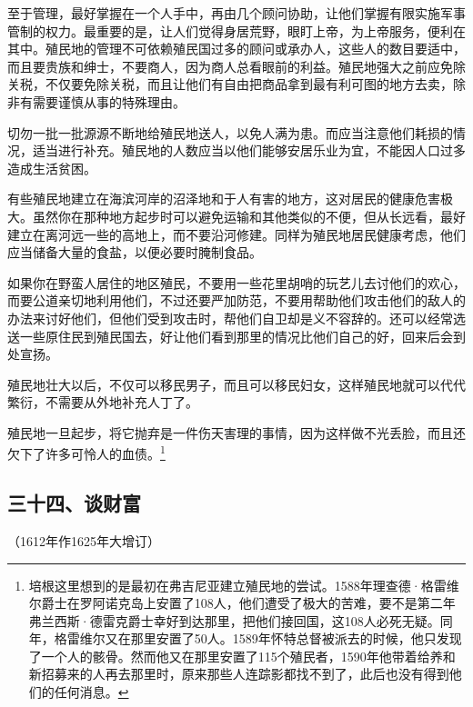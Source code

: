 \par 至于管理，最好掌握在一个人手中，再由几个顾问协助，让他们掌握有限实施军事管制的权力。最重要的是，让人们觉得身居荒野，眼盯上帝，为上帝服务，便利在其中。殖民地的管理不可依赖殖民国过多的顾问或承办人，这些人的数目要适中，而且要贵族和绅士，不要商人，因为商人总看眼前的利益。殖民地强大之前应免除关税，不仅要免除关税，而且让他们有自由把商品拿到最有利可图的地方去卖，除非有需要谨慎从事的特殊理由。
\par 切勿一批一批源源不断地给殖民地送人，以免人满为患。而应当注意他们耗损的情况，适当进行补充。殖民地的人数应当以他们能够安居乐业为宜，不能因人口过多造成生活贫困。
\par 有些殖民地建立在海滨河岸的沼泽地和于人有害的地方，这对居民的健康危害极大。虽然你在那种地方起步时可以避免运输和其他类似的不便，但从长远看，最好建立在离河远一些的高地上，而不要沿河修建。同样为殖民地居民健康考虑，他们应当储备大量的食盐，以便必要时腌制食品。
\par 如果你在野蛮人居住的地区殖民，不要用一些花里胡哨的玩艺儿去讨他们的欢心，而要公道亲切地利用他们，不过还要严加防范，不要用帮助他们攻击他们的敌人的办法来讨好他们，但他们受到攻击时，帮他们自卫却是义不容辞的。还可以经常选送一些原住民到殖民国去，好让他们看到那里的情况比他们自己的好，回来后会到处宣扬。
\par 殖民地壮大以后，不仅可以移民男子，而且可以移民妇女，这样殖民地就可以代代繁衍，不需要从外地补充人丁了。
\par 殖民地一旦起步，将它抛弃是一件伤天害理的事情，因为这样做不光丢脸，而且还欠下了许多可怜人的血债。\footnote{培根这里想到的是最初在弗吉尼亚建立殖民地的尝试。1588年理查德·格雷维尔爵士在罗阿诺克岛上安置了108人，他们遭受了极大的苦难，要不是第二年弗兰西斯·德雷克爵士幸好到达那里，把他们接回国，这108人必死无疑。同年，格雷维尔又在那里安置了50人。1589年怀特总督被派去的时候，他只发现了一个人的骸骨。然而他又在那里安置了115个殖民者，1590年他带着给养和新招募来的人再去那里时，原来那些人连踪影都找不到了，此后也没有得到他们的任何消息。}




\subsection*{三十四、谈财富}
\begin{center}
    （1612年作1625年大增订）
\end{center}

